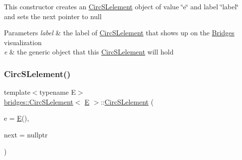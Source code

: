 This constructor creates an \mbox{\hyperlink{classbridges_1_1_circ_s_lelement}{Circ\+S\+Lelement}} object of value \char`\"{}e\char`\"{} and label \char`\"{}label\char`\"{} and sets the next pointer to null


\begin{DoxyParams}{Parameters}
{\em label} & the label of \mbox{\hyperlink{classbridges_1_1_circ_s_lelement}{Circ\+S\+Lelement}} that shows up on the \mbox{\hyperlink{classbridges_1_1_bridges}{Bridges}} visualization \\
\hline
{\em e} & the generic object that this \mbox{\hyperlink{classbridges_1_1_circ_s_lelement}{Circ\+S\+Lelement}} will hold \\
\hline
\end{DoxyParams}
\mbox{\label{classbridges_1_1_circ_s_lelement_a0dd7605959b4b52de041e9bcbe5abce7}} 
\subsubsection{\texorpdfstring{CircSLelement()}{CircSLelement()}\hspace{0.1cm}{\footnotesize\ttfamily [3/4]}}
{\footnotesize\ttfamily template$<$typename E$>$ \\
\mbox{\hyperlink{classbridges_1_1_circ_s_lelement}{bridges\+::\+Circ\+S\+Lelement}}$<$ \mbox{\hyperlink{namespacebridges_acfb0a4f7877d8f63de3e6862004c50eda3a3ea00cfc35332cedf6e5e9a32e94da}{E}} $>$\+::\mbox{\hyperlink{classbridges_1_1_circ_s_lelement}{Circ\+S\+Lelement}} (\begin{DoxyParamCaption}\item[{\mbox{\hyperlink{namespacebridges_acfb0a4f7877d8f63de3e6862004c50eda3a3ea00cfc35332cedf6e5e9a32e94da}{E}}}]{e = {\ttfamily \mbox{\hyperlink{namespacebridges_acfb0a4f7877d8f63de3e6862004c50eda3a3ea00cfc35332cedf6e5e9a32e94da}{E}}()},  }\item[{\mbox{\hyperlink{classbridges_1_1_circ_s_lelement}{Circ\+S\+Lelement}}$<$ \mbox{\hyperlink{namespacebridges_acfb0a4f7877d8f63de3e6862004c50eda3a3ea00cfc35332cedf6e5e9a32e94da}{E}} $>$ $\ast$}]{next = {\ttfamily nullptr} }\end{DoxyParamCaption})\hspace{0.3cm}{\ttfamily [inline]}}

